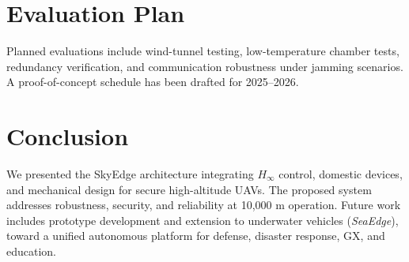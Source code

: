 \documentclass[conference]{IEEEtran}
\begin{document}
\section{Evaluation Plan}
Planned evaluations include wind-tunnel testing, low-temperature chamber 
tests, redundancy verification, and communication robustness under 
jamming scenarios. A proof-of-concept schedule has been drafted for 
2025--2026.

\section{Conclusion}
We presented the SkyEdge architecture integrating $H_\infty$ control, 
domestic devices, and mechanical design for secure high-altitude UAVs. 
The proposed system addresses robustness, security, and reliability at 
10,000 m operation. Future work includes prototype development and 
extension to underwater vehicles (\emph{SeaEdge}), toward a unified 
autonomous platform for defense, disaster response, GX, and education.



\end{document}
